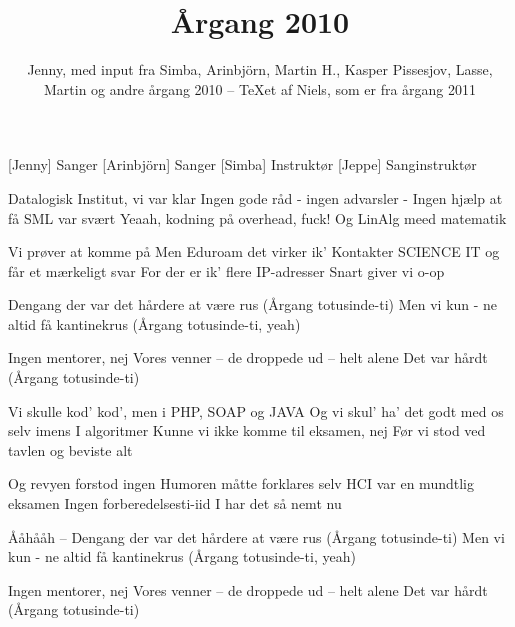 \documentclass[a4paper,11pt]{article}
\title{Årgang 2010}
\author{Jenny, med input fra Simba, Arinbjörn, Martin H., Kasper Pissesjov,
Lasse, Martin og andre årgang 2010 -- TeXet af Niels, som er fra årgang 2011}
\begin{document}
\maketitle

\begin{roles}
[Jenny] Sanger
[Arinbjörn] Sanger
[Simba] Instruktør
[Jeppe] Sanginstruktør
\end{roles}

\begin{song}



 Datalogisk Institut, vi var klar
 Ingen gode råd - ingen advarsler - Ingen hjælp at få
 SML var svært
 Yeaah, kodning på overhead, fuck!
 Og LinAlg meed matematik


 Vi prøver at komme på
 Men Eduroam det virker ik'
 Kontakter SCIENCE IT og får et mærkeligt svar
 For der er ik' flere IP-adresser
 Snart giver vi o-op

 Dengang der var det hårdere at være rus
 (Årgang totusinde-ti)
 Men vi kun - ne altid få kantinekrus
 (Årgang totusinde-ti, yeah)

 Ingen mentorer,  nej
 Vores venner --  de droppede ud --  helt alene
 Det var hårdt
 (Årgang totusinde-ti)

 Vi skulle kod' kod',  men i PHP, SOAP og JAVA
 Og vi skul' ha' det godt med os selv imens
 I algoritmer
 Kunne vi ikke komme til eksamen,  nej
 Før vi stod ved tavlen og beviste alt

 Og revyen forstod ingen
 Humoren måtte forklares
 selv HCI var en mundtlig eksamen
 Ingen forberedelsesti-iid
 I har det så nemt nu

 Ååhååh -- Dengang der var det hårdere at være rus
 (Årgang totusinde-ti)
 Men vi kun - ne altid få kantinekrus
 (Årgang totusinde-ti, yeah)

 Ingen mentorer,  nej
 Vores venner --  de droppede ud --  helt alene
 Det var hårdt
 (Årgang totusinde-ti)


\end{song}
\end{document}
